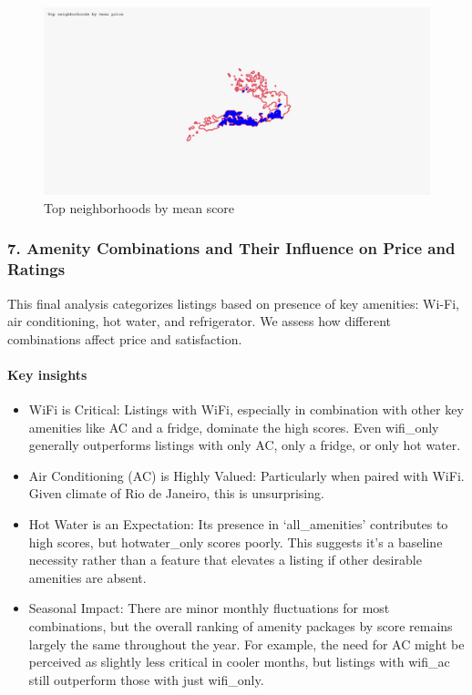 \vspace{1em}
\begin{figure}[H]
    \centering
    \includegraphics[width=1\textwidth]{images/q6_4.jpg}
    \caption{Top neighborhoods by mean score}\label{fig:figureq14}
\end{figure}

\subsubsection*{7. Amenity Combinations and Their Influence on Price and Ratings}

This final analysis categorizes listings based on presence of key amenities: Wi-Fi, air conditioning, hot water, and refrigerator. We assess how different combinations affect price and satisfaction.

\vspace{0.5em}
\paragraph{Key insights}
\begin{itemize}
    \item WiFi is Critical: Listings with WiFi, especially in combination with other key amenities like AC and a fridge, dominate the high scores. Even wifi\_only generally outperforms listings with only AC, only a fridge, or only hot water.
    \item Air Conditioning (AC) is Highly Valued: Particularly when paired with WiFi. Given climate of Rio de Janeiro, this is unsurprising.
    \item Hot Water is an Expectation: Its presence in `all\_amenities' contributes to high scores, but hotwater\_only scores poorly. This suggests it's a baseline necessity rather than a feature that elevates a listing if other desirable amenities are absent.
    \item Seasonal Impact: There are minor monthly fluctuations for most combinations, but the overall ranking of amenity packages by score remains largely the same throughout the year. For example, the need for AC might be perceived as slightly less critical in cooler months, but listings with wifi\_ac still outperform those with just wifi\_only.
\end{itemize}

